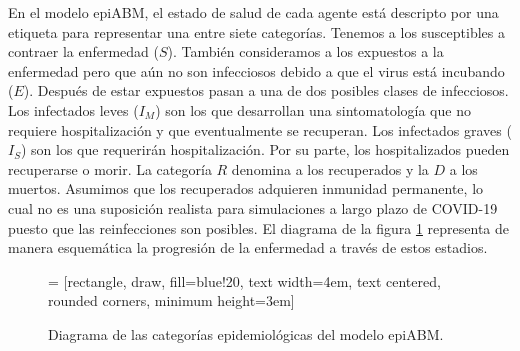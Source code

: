 En el modelo epiABM, el estado de salud de cada agente está descripto por una etiqueta para representar una entre siete categorías. Tenemos a los susceptibles a contraer la enfermedad ($S$). También consideramos a los expuestos a la enfermedad pero que aún no son infecciosos debido a que el virus está incubando ($E$). Después de estar expuestos pasan a una de dos posibles clases de infecciosos. Los infectados leves ($I_M$) son los que desarrollan una sintomatología que no requiere hospitalización y que eventualmente se recuperan. Los infectados graves ($I_S$) son los que requerirán hospitalización. Por su parte, los hospitalizados pueden recuperarse o morir. La categoría $R$ denomina a los recuperados y la $D$ a los muertos. Asumimos que los recuperados adquieren inmunidad permanente, lo cual no es una suposición realista para simulaciones a largo plazo de COVID-19 puesto que las reinfecciones son posibles. El diagrama de la figura \ref{dia:epi_abm} representa de manera esquemática la progresión de la enfermedad a través de estos estadios.

\begin{figure}
    \begin{center}
         = [rectangle, draw, fill=blue!20, 
        text width=4em, text centered, rounded corners, minimum height=3em]
        \centering
    \end{center}
    \caption{Diagrama de las categorías epidemiológicas del modelo epiABM.}
    \label{dia:epi_abm}
\end{figure}

